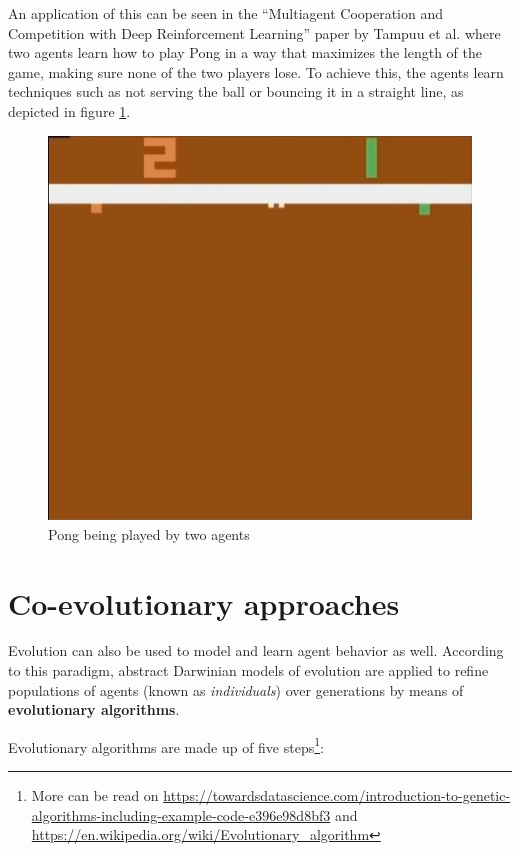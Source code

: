 An application of this can be seen in the ``Multiagent Cooperation and Competition with Deep Reinforcement Learning'' paper by Tampuu et al. \cite{DBLP:journals/corr/TampuuMKKKAAV15} where two agents learn how to play Pong in a way that maximizes the length of the game, making sure none of the two players lose. To achieve this, the agents learn techniques such as not serving the ball or bouncing it in a straight line, as depicted in figure \ref{fig:ch9-multiagentpong}.

\begin{figure}
    \centering
    \includegraphics[scale=0.35]{Images/Chapter 9/multiagent-pong.png}
    \caption{Pong being played by two agents}
    \label{fig:ch9-multiagentpong}
\end{figure}

\section{Co-evolutionary approaches}
Evolution can also be used to model and learn agent behavior as well. According to this paradigm, abstract Darwinian models of evolution are applied to refine populations of agents (known as \textit{individuals}) over generations by means of \textbf{evolutionary algorithms}. 

Evolutionary algorithms are made up of five steps\footnote{More can be read on \url{https://towardsdatascience.com/introduction-to-genetic-algorithms-including-example-code-e396e98d8bf3} and \url{https://en.wikipedia.org/wiki/Evolutionary_algorithm}}:

